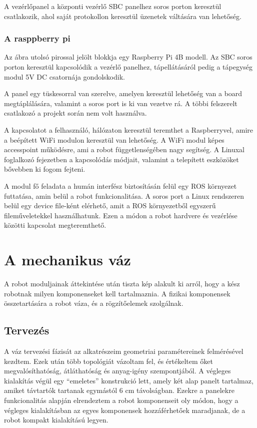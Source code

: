 A vezérlőpanel a központi vezérlő SBC panelhez soros porton keresztül
csatlakozik, ahol saját protokollon keresztül üzenetek váltására van lehetőség. 

\subsubsection{A rasppberry pi}

Az ábra utolsó pirossal jelölt blokkja egy Raspberry Pi 4B modell. Az SBC soros
porton keresztül kapcsolódik a vezérlő panelhez, tápellátásáról pedig a tápegység
modul 5V DC csatornája gondolskodik.

A panel egy tüskesorral van szerelve, amelyen keresztül lehetőség van a board
megtáplálására, valamint a soros port is ki van vezetve rá. A többi felszerelt
csatlakozó a projekt során nem volt használva.

\medskip

A kapcsolatot a felhasználó, hálózaton keresztül teremthet a Raspberryvel, amire
a beépített WiFi modulon keresztül van lehetőség. A WiFi modul képes accesspoint
működésre, ami a robot függetlenségében nagy segítség. A Linuxal foglalkozó
fejezetben a kapcsolódás módjait, valamint a telepített eszközöket bővebben ki
fogom fejteni.

\medskip

A modul fő feladata a humán interfész biztosításán felül egy ROS környezet
futtatása, amin belül a robot funkcionalitása. A soros port a Linux rendszeren
belül egy device file-ként elérhető, amit a ROS környezetből egyszerű
fileműveletekkel használhatunk. Ezen a módon a robot hardvere és vezérlése
közötti kapcsolat megteremthető.

\section{A mechanikus váz}

A robot moduljainak áttekintése után tiszta kép alakult ki arról, hogy a kész
robotnak milyen komponenseket kell tartalmaznia. A fizikai komponensek
összetartására a robot váza, és a rögzítőelemek szolgálnak. 

\subsection{Tervezés}

A váz tervezési fázisát az alkatrészeim geometriai paramétereinek felmérésével
kezdtem. Ezek után több topológiát vázoltam fel, és értékeltem őket
megvalósíthatóság, átláthatóság és anyag-igény szempontjából. A végleges
kialakítás végül egy ``emeletes'' konstrukció lett, amely két alap panelt
tartalmaz, amiket távtartók tartanak egymástól 6 cm távolságban. Ezekre a
panelekre funkcionalitás alapján elrendeztem a robot komponenseit oly módon, hogy
a végleges kialakításban az egyes komponensek hozzáférhetőek maradjanak, de a
robot kompakt kialakítású legyen.


